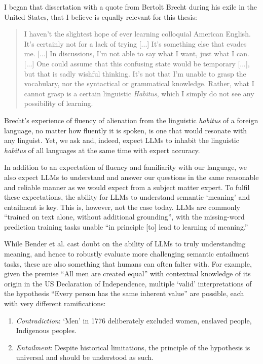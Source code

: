 \documentclass[12pt,twoside]{report}
\begin{document}
I began that dissertation with a quote from Bertolt Brecht during his exile in the United States, that I believe is equally relevant for this thesis:
\begin{quote}
    I haven't the slightest hope of ever learning colloquial American English. It's certainly not for a lack of trying [...] It's something else that evades me. [...] In discussions, I'm not able to say what I want, just what I can. [...] One could assume that this confusing state would be temporary [...], but that is sadly wishful thinking. It's not that I'm unable to grasp the vocabulary, nor the syntactical or grammatical knowledge. Rather, what I cannot grasp is a certain linguistic \textit{Habitus}, which I simply do not see any possibility of learning.\cite{brecht}
\end{quote}

Brecht's experience of fluency of alienation from the linguistic \textit{habitus} of a foreign language, no matter how fluently it is spoken, is one that would resonate with any linguist. Yet, we ask and, indeed, expect LLMs to inhabit the linguistic \textit{habitus} of all languages at the same time with expert accuracy. \newline \par

In addition to an expectation of fluency and familiarity with our language, we also expect LLMs to understand and answer our questions in the same reasonable and reliable manner as we would expect from a subject matter expert. To fulfil these expectations, the ability for LLMs to understand semantic `meaning' and entailment is key. This is, however, not the case today. LLMs are commonly ``trained on text alone, without additional grounding''\cite{merrill-etal-2022-entailment}, with the missing-word prediction training tasks unable ``in principle [to] lead to learning of meaning.''\cite{bender-koller-2020-climbing} \newline \par 
While Bender et al. cast doubt on the ability of LLMs to truly understanding meaning, and hence to robustly evaluate more challenging semantic entailment tasks, these are also something that humans can often falter with. For example, given the premise ``All men are created equal'' with contextual knowledge of its origin in the US Declaration of Independence, multiple `valid' interpretations of the hypothesis ``Every person has the same inherent value'' are possible, each with very different ramifications:
\begin{enumerate}
    \item \textit{Contradiction}: `Men' in 1776 deliberately excluded women, enslaved people, Indigenous peoples.
    \item \textit{Entailment}: Despite historical limitations, the principle of the hypothesis is universal and should be understood as such.
\end{enumerate}
\end{document}
